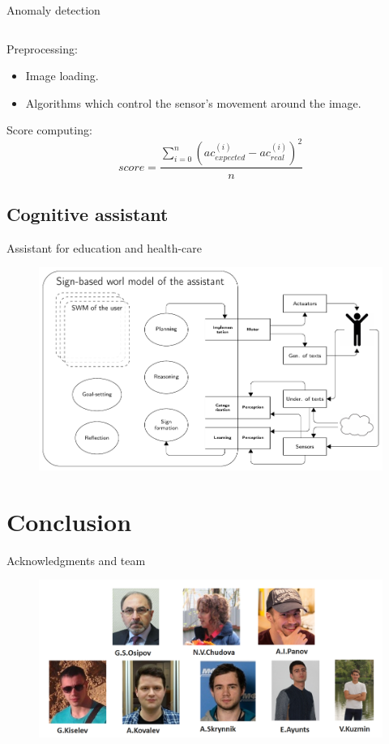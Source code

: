 \documentclass[default]{beamer}
\begin{document}
\begin{frame}{Anomaly detection}
\begin{columns}
\begin{column}{0.5\textwidth}
			\end{column}
		\end{columns}
		Preprocessing:
		\begin{itemize}
			\item Image loading.
			\item Algorithms which control the sensor's movement around the image.
		\end{itemize}
		Score computing:
		\[
		score = \frac{\sum_{i=0}^n \left(ac_{expected}^{(i)}-ac_{real}^{(i)}\right)^2}{n}
		\]
		\vspace{-5pt}
		\nocite{*}
		\printbibliography[keyword={anomaly}, resetnumbers=true]		
		\end{frame}	
	\subsection{Cognitive assistant}
		\begin{frame}{Assistant for education and health-care}
		
		\begin{figure}
			\includegraphics[width=\textwidth]{agent-schemas/en/cogasst_en}
		\end{figure}
	\end{frame}

	\section{Conclusion}
		\begin{frame}{Acknowledgments and team}
		
		\begin{figure}
			\includegraphics[width=\textwidth]{misc/photos/team_en.png}
		\end{figure}
	\end{frame}
	
\end{document}
